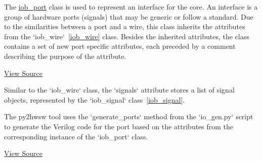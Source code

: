 %

%
%

The \href{https://github.com/IObundle/py2hwsw/blob/main/py2hwsw/scripts/iob_port.py}{iob\_port} class is used to represent an interface for the core.
An interface is a group of hardware ports (signals) that may be generic or follow a standard.
Due to the similarities between a port and a wire, this class inherits the attributes from the `iob\_wire`~\ref{iob_wire} class.
Besides the inherited attributes, the class contains a set of new port specific attributes, each preceded by a comment describing the purpose of the attribute.


\href{https://github.com/IObundle/py2hwsw/blob/main/py2hwsw/scripts/iob_port.py}{View Source}

Similar to the `iob\_wire` class, the `signals` attribute stores a list of signal objects, represented by the `iob\_signal` class~\ref{iob_signal}.

%
%

The py2hwsw tool uses the `generate\_ports` method from the `io\_gen.py` script to generate the Verilog code for the port based on the attributes from the corresponding instance of the `iob\_port` class.


\href{https://github.com/IObundle/py2hwsw/blob/main/py2hwsw/scripts/io_gen.py}{View Source}
